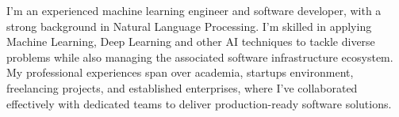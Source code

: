 

\begin{cvparagraph}



I'm an experienced machine learning engineer and software developer, with a strong background in Natural Language Processing. I'm skilled in applying Machine Learning, Deep Learning and other AI techniques to tackle diverse problems while also managing the associated software infrastructure ecosystem. My professional experiences span over academia, startups environment, freelancing projects, and established enterprises, where I've collaborated effectively with dedicated teams to deliver production-ready software solutions.




\end{cvparagraph}


